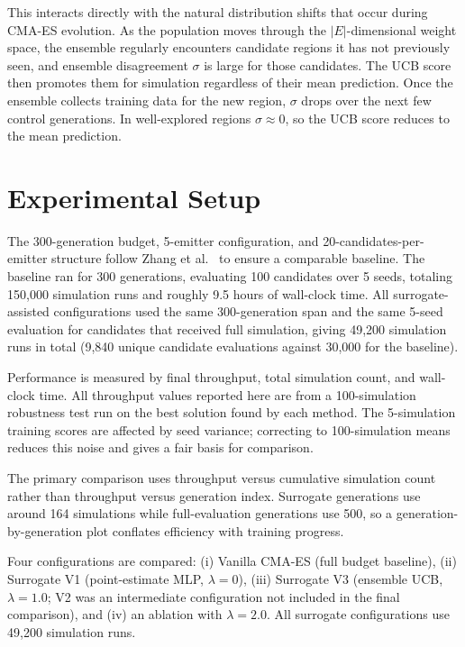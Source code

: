\documentclass[conference]{IEEEtran}
\begin{document}
This interacts directly with the natural distribution shifts that occur
during CMA-ES evolution. As the population moves through the
$|E|$-dimensional weight space, the ensemble regularly encounters
candidate regions it has not previously seen, and ensemble disagreement
$\sigma$ is large for those candidates. The UCB score then promotes them
for simulation regardless of their mean prediction. Once the ensemble
collects training data for the new region, $\sigma$ drops over the next
few control generations. In well-explored regions $\sigma \approx 0$,
so the UCB score reduces to the mean prediction.



\section{Experimental Setup}

The 300-generation budget, 5-emitter configuration, and 20-candidates-per-emitter
structure follow Zhang et al.~\cite{zhang2024} to ensure a comparable baseline.
The baseline ran for 300 generations, evaluating 100 candidates over 5
seeds, totaling 150,000 simulation runs and roughly 9.5 hours of wall-clock
time. All surrogate-assisted configurations used the same 300-generation
span and the same 5-seed evaluation for candidates that received full
simulation, giving 49,200 simulation runs in total (9,840 unique candidate
evaluations against 30,000 for the baseline).

Performance is measured by final throughput, total simulation count, and
wall-clock time. All throughput values reported here are from a
100-simulation robustness test run on the best solution found by each
method. The 5-simulation training scores are affected by seed variance;
correcting to 100-simulation means reduces this noise and gives a fair
basis for comparison.

The primary comparison uses throughput versus cumulative simulation count
rather than throughput versus generation index. Surrogate generations use
around 164 simulations while full-evaluation generations use 500, so a
generation-by-generation plot conflates efficiency with training progress.

Four configurations are compared: (i) Vanilla CMA-ES (full budget
baseline), (ii) Surrogate V1 (point-estimate MLP, $\lambda = 0$),
(iii) Surrogate V3 (ensemble UCB, $\lambda = 1.0$; V2 was an intermediate
configuration not included in the final comparison), and (iv) an ablation
with $\lambda = 2.0$. All surrogate configurations use 49,200 simulation
runs.
\end{document}
